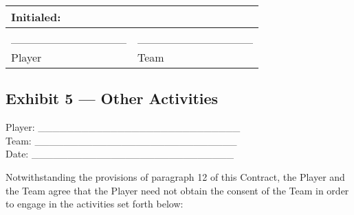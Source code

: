 \documentclass[
]{book}
\begin{document}
\begin{longtable}[]{@{}ll@{}}
\toprule()
Initialed: & \\
\midrule()
\endhead
\_\_\_\_\_\_\_\_\_\_\_\_\_\_ & \_\_\_\_\_\_\_\_\_\_\_\_\_\_ \\
Player & Team \\
\bottomrule()
\end{longtable}

\newpage

\hypertarget{exhibit-5-other-activities}{%
\subsection{Exhibit 5 --- Other Activities}\label{exhibit-5-other-activities}}

Player: \_\_\_\_\_\_\_\_\_\_\_\_\_\_\_\_\_\_\_\_\_\_\_\_\_\_\_\_\\
Team: \_\_\_\_\_\_\_\_\_\_\_\_\_\_\_\_\_\_\_\_\_\_\_\_\_\_\_\_\\
Date: \_\_\_\_\_\_\_\_\_\_\_\_\_\_\_\_\_\_\_\_\_\_\_\_\_\_\_\_

Notwithstanding the provisions of paragraph 12 of this Contract, the Player and the Team agree that the Player need not obtain the consent of the Team in order to engage in the activities set forth below:
\end{document}
